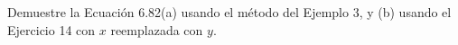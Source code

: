 \item Demuestre la Ecuación 6.82(a) usando el método del Ejemplo 3, y (b) usando el Ejercicio 14 con $x$ reemplazada con $y$.
